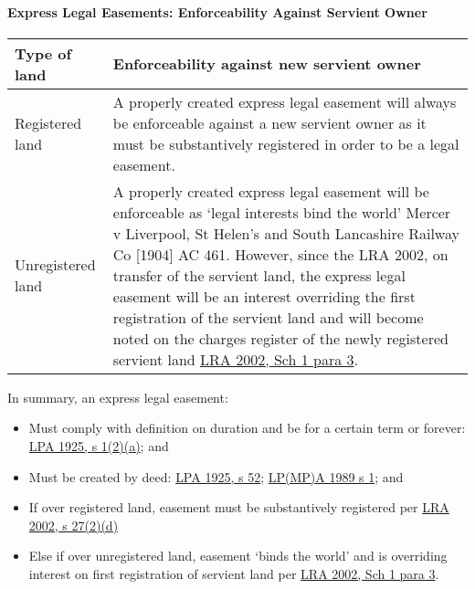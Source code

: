 \documentclass[
]{article}
\providecommand{\tightlist}{%
  \setlength{\itemsep}{0pt}\setlength{\parskip}{0pt}}
\begin{document}
\hypertarget{express-legal-easements-enforceability-against-servient-owner}{%
\paragraph{Express Legal Easements: Enforceability Against Servient
Owner}\label{express-legal-easements-enforceability-against-servient-owner}}

\begin{longtable}[]{@{}ll@{}}
\toprule()
Type of land & Enforceability against new servient owner \\
\midrule()
\endhead
Registered land & A properly created express legal easement will always
be enforceable against a new servient owner as it must be substantively
registered in order to be a legal easement. \\
Unregistered land & A properly created express legal easement will be
enforceable as `legal interests bind the world' Mercer v Liverpool, St
Helen's and South Lancashire Railway Co {[}1904{]} AC 461. However,
since the LRA 2002, on transfer of the servient land, the express legal
easement will be an interest overriding the first registration of the
servient land and will become noted on the charges register of the newly
registered servient land
\href{https://www.legislation.gov.uk/ukpga/2002/9/schedule/1}{LRA 2002,
Sch 1 para 3}. \\
\bottomrule()
\end{longtable}

In summary, an express legal easement:

\begin{itemize}
\tightlist
\item
  Must comply with definition on duration and be for a certain term or
  forever:
  \href{https://www.legislation.gov.uk/ukpga/Geo5/15-16/20/section/1}{LPA
  1925, s 1(2)(a)}; and
\item
  Must be created by deed:
  \href{https://www.legislation.gov.uk/ukpga/Geo5/15-16/20/section/52}{LPA
  1925, s 52};
  \href{https://www.legislation.gov.uk/ukpga/1989/34/section/1}{LP(MP)A
  1989 s 1}; and
\item
  If over registered land, easement must be substantively registered per
  \href{https://www.legislation.gov.uk/ukpga/2002/9/section/27}{LRA
  2002, s 27(2)(d)}
\item
  Else if over unregistered land, easement `binds the world' and is
  overriding interest on first registration of servient land per
  \href{https://www.legislation.gov.uk/ukpga/2002/9/schedule/1}{LRA
  2002, Sch 1 para 3}.
\end{itemize}
\end{document}

